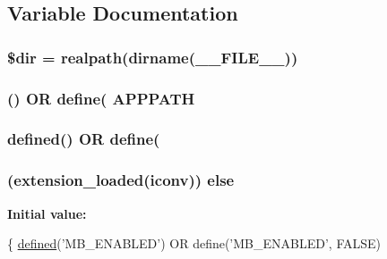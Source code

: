 \subsection{Variable Documentation}
\hypertarget{tests_2_bootstrap_8php_a1659f0a629d408e0f849dbe4ee061e62}{}
\subsubsection[{\$dir}]{\setlength{\rightskip}{0pt plus 5cm}\$dir = realpath(dirname(\+\_\+\+\_\+\+F\+I\+L\+E\+\_\+\+\_\+))}\label{tests_2_bootstrap_8php_a1659f0a629d408e0f849dbe4ee061e62}
\hypertarget{tests_2_bootstrap_8php_a45cc636071e9edf22e5709d3c18bc84f}{}
\subsubsection[{A\+P\+P\+P\+A\+T\+H}]{ (\textquotesingle{}) O\+R define(\textquotesingle{} A\+P\+P\+P\+A\+T\+H}\label{tests_2_bootstrap_8php_a45cc636071e9edf22e5709d3c18bc84f}
\hypertarget{tests_2_bootstrap_8php_a46458e8654a714e0565e20f63021add9}{}
\subsubsection[{defined}]{\setlength{\rightskip}{0pt plus 5cm}defined(\textquotesingle{}) O\+R define(\textquotesingle{}}\label{tests_2_bootstrap_8php_a46458e8654a714e0565e20f63021add9}
\hypertarget{tests_2_bootstrap_8php_a67773d041d277deb84668d80e4099034}{}
\subsubsection[{else}]{ (extension\+\_\+loaded(\textquotesingle{}iconv\textquotesingle{})) else}\label{tests_2_bootstrap_8php_a67773d041d277deb84668d80e4099034}
{\bfseries Initial value\+:}
\begin{DoxyCode}
\{
    \hyperlink{tests_2_bootstrap_8php_a46458e8654a714e0565e20f63021add9}{defined}(\textcolor{stringliteral}{'MB\_ENABLED'}) OR define('MB\_ENABLED', FALSE)
\end{DoxyCode}
\hypertarget{tests_2_bootstrap_8php_acbea7ca989439eea4c6019ad3c5161aa}{}
